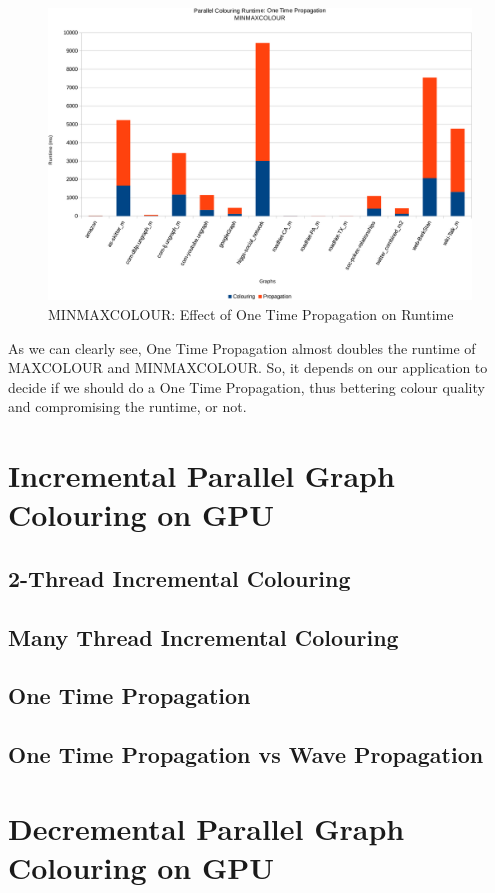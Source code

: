 \documentclass[MTech]{iitmdiss}
\begin{document}
\begin{figure}[h]
    \centering
    \includegraphics[width=\textwidth,keepaspectratio=true]{chartNewest10.pdf}
    \caption{
        MINMAXCOLOUR: Effect of One Time Propagation on Runtime
    }
    \label{fig:chart10}
\end{figure}

As we can clearly see, One Time Propagation almost doubles the runtime of MAXCOLOUR and MINMAXCOLOUR. So, it depends on our application to decide if we should do a One Time Propagation, thus bettering colour quality and compromising the runtime, or not.

\section{Incremental Parallel Graph Colouring on GPU}
\subsection{2-Thread Incremental Colouring}
\subsection{Many Thread Incremental Colouring}
\subsection{One Time Propagation}
\subsection{One Time Propagation vs Wave Propagation}

\section{Decremental Parallel Graph Colouring on GPU}
\end{document}
